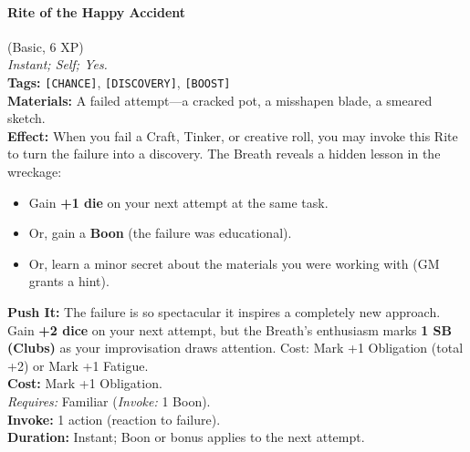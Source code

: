\paragraph{Rite of the Happy Accident} (Basic, 6 XP) \hfill \\
\emph{Instant; Self; Yes.} \\
\textbf{Tags:} \texttt{[CHANCE]}, \texttt{[DISCOVERY]}, \texttt{[BOOST]} \\
\textbf{Materials:} A failed attempt---a cracked pot, a misshapen blade, a smeared sketch. \\
\textbf{Effect:} When you fail a Craft, Tinker, or creative roll, you may invoke this Rite to turn the failure into a discovery. The Breath reveals a hidden lesson in the wreckage:
\begin{itemize}
  \item Gain \textbf{+1 die} on your next attempt at the same task.
  \item Or, gain a \textbf{Boon} (the failure was educational).
  \item Or, learn a minor secret about the materials you were working with (GM grants a hint).
\end{itemize}
\textbf{Push It:} The failure is so spectacular it inspires a completely new approach. Gain \textbf{+2 dice} on your next attempt, but the Breath's enthusiasm marks \textbf{1 SB (Clubs)} as your improvisation draws attention. Cost: Mark +1 Obligation (total +2) or Mark +1 Fatigue. \\
\textbf{Cost:} Mark +1 Obligation. \\
\textit{Requires:} Familiar (\textit{Invoke:} 1 Boon). \\
\textbf{Invoke:} 1 action (reaction to failure). \\
\textbf{Duration:} Instant; Boon or bonus applies to the next attempt.

